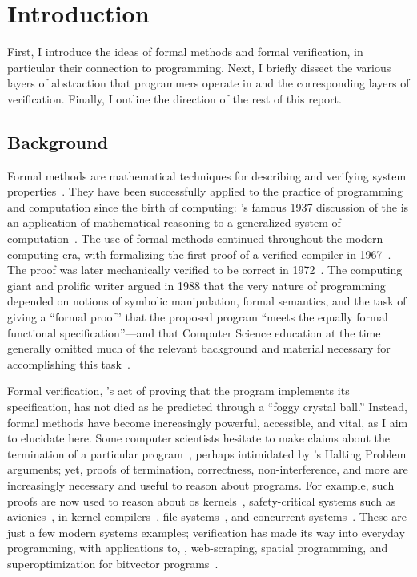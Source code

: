 \section{Introduction}

First, I introduce the ideas of formal methods and formal verification, in
particular their connection to programming. Next, I briefly dissect the various
layers of abstraction that programmers operate in and the corresponding
layers of verification. Finally, I outline the direction of the rest of this
report.

\subsection{Background}\label{S:background}

Formal methods are mathematical techniques for describing and verifying system
properties~\cite{Wing_90}. They have been successfully applied to the practice
of programming and computation since the birth of computing:
\citeauthor{Turing_1937}'s famous 1937 discussion of the {\haltprob} is an
application of mathematical reasoning to a generalized system of
computation~\cite{Turing_1937}. The use of formal methods continued throughout
the modern computing era, with \citeauthor{McCarthy_67} formalizing the first
proof of a verified compiler in 1967~\cite{McCarthy_67}. The proof was later
mechanically verified to be correct in 1972~\cite{Milner_72}. The computing
giant and prolific writer \citeauthor{EWD:EWD1036} argued in 1988 that the very
nature of programming depended on notions of symbolic manipulation, formal
semantics, and the task of giving a ``formal proof'' that the proposed program
``meets the equally formal functional specification''---and that Computer
Science education at the time generally omitted much of the relevant background
and material necessary for accomplishing this task~\cite{EWD:EWD1036}.

Formal verification, \citeauthor{EWD:EWD1036}'s act of proving that the program
implements its specification, has not died as he predicted through a ``foggy
crystal ball.'' Instead, formal methods have become increasingly powerful,
accessible, and vital, as I aim to elucidate here. Some computer scientists
hesitate to make claims about the termination of a particular
program~\cite{Cook_2011}, perhaps intimidated by \citeauthor{Turing_1937}'s
Halting Problem arguments; yet, proofs of termination, correctness,
non-interference, and more are increasingly necessary and useful to reason about
programs. For example, such proofs are now used to reason about \gls{os}
kernels~\cite{Klein_EHACDEEKNSTW_09,Klein_AEHCDEEKNSTW_10,Klein_AEMSKH_14,Sewell_KH_16,Narayanan_2019,Narayan_2020,Nelson_2017},
safety-critical systems such as avionics~\cite[\S 1]{Leroy-Compcert-CACM},
in-kernel compilers~\cite{186144,258848}, file-systems~\cite{Zou_2019}, and
concurrent systems~\cite{222565,222621}. These are just a few modern systems
examples; verification has made its way into everyday programming, with
applications to, \eg, web-scraping, spatial programming, and superoptimization
for bitvector programs~\cite[\S 4]{Torlak_2013}.

